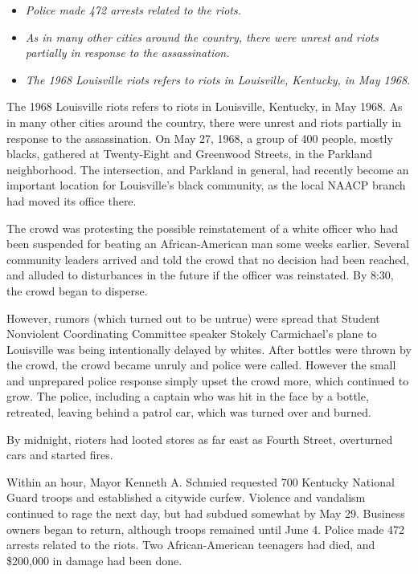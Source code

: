 \begin{itemize}
\item
  \emph{Police made 472 arrests related to the riots.}
\item
  \emph{As in many other cities around the country, there were unrest
  and riots partially in response to the assassination.}
\item
  \emph{The 1968 Louisville riots refers to riots in Louisville,
  Kentucky, in May 1968.}
\end{itemize}

The 1968 Louisville riots refers to riots in Louisville, Kentucky, in
May 1968. As in many other cities around the country, there were unrest
and riots partially in response to the assassination. On May 27, 1968, a
group of 400 people, mostly blacks, gathered at Twenty-Eight and
Greenwood Streets, in the Parkland neighborhood. The intersection, and
Parkland in general, had recently become an important location for
Louisville's black community, as the local NAACP branch had moved its
office there.

The crowd was protesting the possible reinstatement of a white officer
who had been suspended for beating an African-American man some weeks
earlier. Several community leaders arrived and told the crowd that no
decision had been reached, and alluded to disturbances in the future if
the officer was reinstated. By 8:30, the crowd began to disperse.

However, rumors (which turned out to be untrue) were spread that Student
Nonviolent Coordinating Committee speaker Stokely Carmichael's plane to
Louisville was being intentionally delayed by whites. After bottles were
thrown by the crowd, the crowd became unruly and police were called.
However the small and unprepared police response simply upset the crowd
more, which continued to grow. The police, including a captain who was
hit in the face by a bottle, retreated, leaving behind a patrol car,
which was turned over and burned.

By midnight, rioters had looted stores as far east as Fourth Street,
overturned cars and started fires.

Within an hour, Mayor Kenneth A. Schmied requested 700 Kentucky National
Guard troops and established a citywide curfew. Violence and vandalism
continued to rage the next day, but had subdued somewhat by May 29.
Business owners began to return, although troops remained until June 4.
Police made 472 arrests related to the riots. Two African-American
teenagers had died, and \$200,000 in damage had been done.

